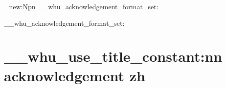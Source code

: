 

\cs_new:Npn \__whu_acknowledgement_format_set: { }
 {}
  {
    \__whu_acknowledgement_format_set:
    \chapter
      [ \__whu_use_title_constant:nn { acknowledgement } { zh-toc } ]
      { \__whu_use_title_constant:nn { acknowledgement } { zh } }
  }
  {
  }